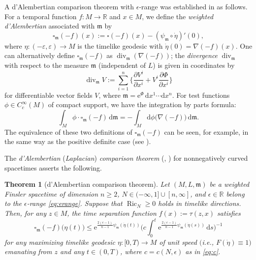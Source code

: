 \documentclass[a4paper,11pt]{article}
\numberwithin{equation}{section}
\theoremstyle{definition}
\theoremstyle{plain}
\newtheorem{theorem}[definition]{Theorem}
\newcommand{\ve}{\varepsilon}
\newcommand{\ez}{\epsilon}
\newcommand{\del}{\partial}
\newcommand{\lra}{\longrightarrow}
\newcommand{\e}{\mathrm{e}}
\newcommand{\dd}{\mathrm{d}}
\newcommand{\R}{\ensuremath{\mathbb{R}}}
\newcommand{\fm}{\ensuremath{\mathfrak{m}}}
\def\div{\mathop{\mathrm{div}}\nolimits}
\def\Ric{\mathop{\mathrm{Ric}}\nolimits}
\begin{document}
A d'Alembertian comparison theorem with $\ez$-range was established in \cite{LMO2} as follows.
For a temporal function $f\colon M \lra \R$ and $x \in M$, we define the \emph{weighted d'Alembertian} associated with $\fm$ by
\begin{equation}\label{eq:wdA}
\square_\fm (-f)(x) :=\square(-f)(x) -(\psi_\fm \circ \dot{\eta})'(0),
\end{equation}
where $\eta\colon (-\ve,\ve) \lra M$ is the timelike geodesic with $\dot{\eta}(0)=\nabla(-f)(x)$.
One can alternatively define $\square_\fm(-f)$ as $\div_\fm(\nabla(-f))$; the \emph{divergence} $\div_\fm$ with respect to the measure $\fm$ (independent of $L$) is given in coordinates by
\begin{equation}\label{eq:div}
\div_\fm V :=\sum_{i=1}^n \bigg\{ \frac{\del V^i}{\del x^i} +V^i \frac{\del\Phi}{\del x^i} \bigg\}
\end{equation}
for differentiable vector fields $V$, where $\fm=\e^\Phi \,\dd x^1 \cdots \dd x^n$.
For test functions $\phi \in C^\infty_c(M)$ of compact support, we have  the integration by parts formula:
\[ \int_M \phi \cdot \square_\fm (-f) \,\dd\fm
 =-\int_M \dd\phi \bigl( \nabla(-f) \bigr) \,\dd\fm. \]
The equivalence of these two definitions of $\square_\fm(-f)$ can be seen, for example, in the same way as the positive definite case (see \cite[Lemma~12.4]{Obook}).

The \emph{d'Alembertian} (\emph{Laplacian}) \emph{comparison theorem} (\cite[Theorem~5.8]{LMO2}, \cite[Theorem~3.1]{LMO3}) for nonnegatively curved spacetimes asserts the following.

\begin{theorem}[d'Alembertian comparison theorem]\label{th:Lcomp}
Let $(M,L,\fm)$ be a weighted Finsler spacetime of dimension $n \ge 2$,
$N \in (-\infty,1] \cup [n,\infty]$, and $\ez \in \R$ belong to the $\ez$-range \eqref{eq:erange}.
Suppose that $\Ric_N \ge 0$ holds in timelike directions.
Then, for any $z \in M$, the time separation function $f(x):=\tau(z,x)$ satisfies
\begin{equation}\label{eq:Lcomp}
\square_\fm (-f) \big( \eta(t) \big)
 \le \e^{\frac{2(\ez -1)}{n-1} \psi_\fm(\dot{\eta}(t))}
 \bigg( c\int_0^t \e^{\frac{2(\ez -1)}{n-1} \psi_\fm(\dot{\eta}(s))} \,\dd s \bigg)^{-1}
\end{equation}
for any maximizing timelike geodesic $\eta\colon [0,T) \lra M$ of unit speed
$($i.e., $F(\dot{\eta})\equiv 1)$ emanating from $z$
and any $t \in (0,T)$, where $c=c(N,\ez)$ as in \eqref{eq:c}.
\end{theorem}
\end{document}
